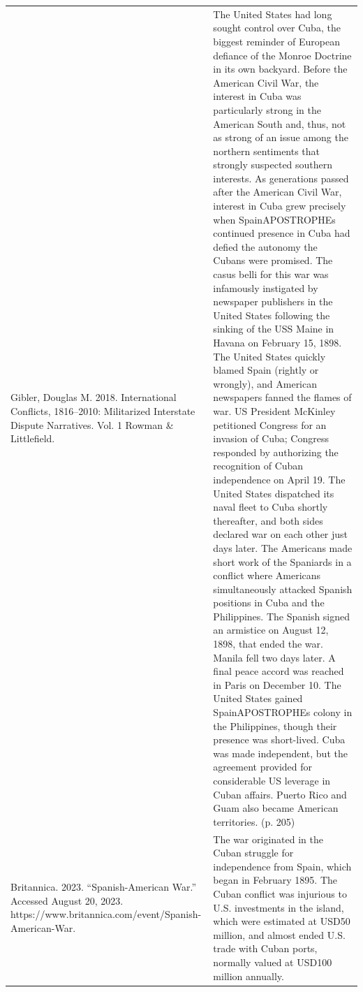 {\begin{longtable}{p{}p{}}
Gibler, Douglas M. 2018. International Conflicts, 1816–2010: Militarized Interstate Dispute Narratives. Vol. 1 Rowman \& Littlefield. & The United States had long sought control over Cuba, the biggest reminder of European defiance of the Monroe Doctrine in its own backyard. Before the American Civil War, the interest in Cuba was particularly strong in the American South and, thus, not as strong of an issue among the northern sentiments that strongly suspected southern interests. As generations passed after the American Civil War, interest in Cuba grew precisely when SpainAPOSTROPHEs continued presence in Cuba had defied the autonomy the Cubans were promised. The casus belli for this war was infamously instigated by newspaper publishers in the United States following the sinking of the USS Maine in Havana on February 15, 1898. The United States quickly blamed Spain (rightly or wrongly), and American newspapers fanned the flames of war. US President McKinley petitioned Congress for an invasion of Cuba; Congress responded by authorizing the recognition of Cuban independence on April 19. The United States dispatched its naval fleet to Cuba shortly thereafter, and both sides declared war on each other just days later. The Americans made short work of the Spaniards in a conflict where Americans simultaneously attacked Spanish positions in Cuba and the Philippines. The Spanish signed an armistice on August 12, 1898, that ended the war. Manila fell two days later. A final peace accord was reached in Paris on December 10. The United States gained SpainAPOSTROPHEs colony in the Philippines, though their presence was short-lived. Cuba was made independent, but the agreement provided for considerable US leverage in Cuban affairs. Puerto Rico and Guam also became American territories. (p. 205)
\\
Britannica. 2023. “Spanish-American War.” Accessed August 20, 2023. https://www.britannica.com/event/Spanish-American-War. & The war originated in the Cuban struggle for independence from Spain, which began in February 1895. The Cuban conflict was injurious to U.S. investments in the island, which were estimated at USD50 million, and almost ended U.S. trade with Cuban ports, normally valued at USD100 million annually.
\\

\end{longtable}}
